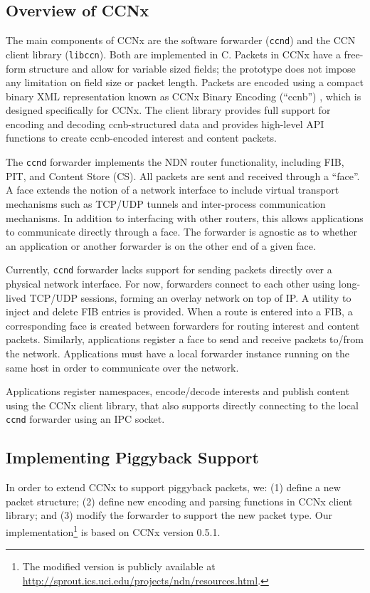 \documentclass[conference]{IEEEtran}
\begin{document}
\subsection{Overview of CCNx}
The main components of CCNx are the software forwarder (\verb|ccnd|) and the CCN client library
(\verb|libccn|). Both are implemented in C.
Packets in CCNx have a free-form structure and allow for variable sized fields; the prototype
does not impose any limitation on field size or packet length. Packets are encoded using a 
compact binary XML representation known as CCNx Binary Encoding (``{ccnb}'') 
\cite{ccnb-specifications}, which is designed specifically for CCNx. The client library 
provides full support for encoding and decoding ccnb-structured data and provides 
high-level API functions to create ccnb-encoded interest and content packets.

The \verb|ccnd| forwarder implements the NDN router functionality, including FIB, 
PIT, and Content Store (CS). All packets are sent and received through a ``face''. A 
face extends the notion of a network interface to include virtual transport 
mechanisms such as TCP/UDP tunnels and inter-process communication 
mechanisms. In addition to interfacing with other routers, this allows applications 
to communicate directly through a face. The forwarder is agnostic as to whether an
application or another forwarder is on the other end of a given face.

Currently, \verb|ccnd| forwarder lacks support for sending packets directly over a 
physical network interface. For now, forwarders connect to each other using long-lived 
TCP/UDP sessions, forming an overlay network on top of IP. A utility to inject and delete 
FIB entries is provided. When a route is entered into a FIB, a corresponding face is 
created between forwarders for routing interest and content packets. Similarly, 
applications register a face to send and receive packets to/from the network. 
Applications must have a local forwarder instance running on the same host in order 
to communicate over the network.

Applications register namespaces, encode/decode interests and publish content using
the CCNx client library, that also supports directly connecting to the local 
\verb|ccnd| forwarder using an IPC socket.

\subsection{Implementing Piggyback Support}
In order to extend CCNx to support piggyback packets, we: (1) define a new packet structure; 
(2) define new encoding and parsing functions in CCNx client library; and (3) modify the 
forwarder to support the new packet type. Our
implementation\footnote{The modified version is publicly available at \url{http://sprout.ics.uci.edu/projects/ndn/resources.html}.}
 is based on CCNx version 0.5.1.
\end{document}
